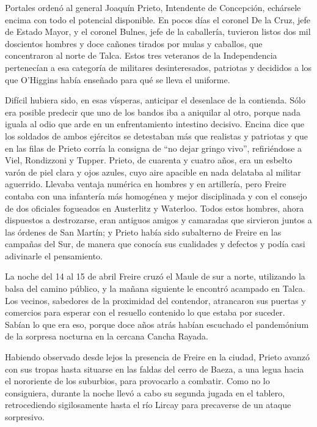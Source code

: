 \documentclass[10pt,twoside,openright]{memoir}
\begin{document}
Portales ordenó al general Joaquín Prieto, Intendente de Concepción,
echársele encima con todo el potencial disponible. En pocos días el
coronel De la Cruz, jefe de Estado Mayor, y el coronel Bulnes, jefe de
la caballería, tuvieron listos dos mil doscientos hombres y doce cañones
tirados por mulas y caballos, que concentraron al norte de Talca. Estos
tres veteranos de la Independencia pertenecían a esa categoría
 de militares desinteresados,
patriotas y decididos a los que O'Higgins había enseñado para qué se
lleva el uniforme.

Difícil hubiera sido, en esas vísperas, anticipar el desenlace de la
contienda. Sólo era posible predecir que uno de los bandos iba a
aniquilar al otro, porque nada iguala al odio que arde en un
enfrentamiento intestino decisivo. Encina dice que los soldados de ambos
ejércitos se detestaban más que realistas y patriotas y que en las filas
de Prieto corría la consigna de ``no dejar gringo vivo'', refiriéndose a
Viel, Rondizzoni y Tupper. Prieto, de cuarenta y cuatro años, era un esbelto 
varón de piel clara y ojos  azules, cuyo aire
apacible en nada delataba al militar aguerrido. Llevaba ventaja numérica
en hombres y en artillería, pero Freire contaba con una infantería
más homogénea y mejor disciplinada y
con el consejo de dos oficiales fogueados en Austerlitz y Waterloo.
Todos estos hombres, ahora dispuestos a destrozarse, eran antiguos
amigos y camaradas que sirvieron juntos a las órdenes de San Martín; y
Prieto había sido subalterno de Freire en las campañas del Sur, de
manera que conocía sus cualidades y defectos y podía casi adivinarle el
pensamiento.

La noche del 14 al 15 de abril Freire cruzó el Maule de sur a norte,
utilizando la balsa del camino público, y la mañana siguiente le
encontró acampado en Talca. Los vecinos, sabedores de la proximidad del
contendor, atrancaron sus puertas y comercios para esperar con el
resuello contenido lo que estaba por suceder. Sabían lo que era eso,
porque doce años atrás habían escuchado el pandemónium de la sorpresa
nocturna en la cercana Cancha Rayada.


Habiendo observado desde lejos la presencia de Freire en la ciudad,
Prieto avanzó con sus tropas hasta situarse en las faldas del cerro de
Baeza, a una legua hacia el nororiente de los suburbios, para provocarlo
a combatir. Como no lo consiguiera, durante la noche llevó a cabo su
segunda jugada en el tablero, retrocediendo sigilosamente hasta el río
Lircay para precaverse de un ataque sorpresivo.
\end{document}
